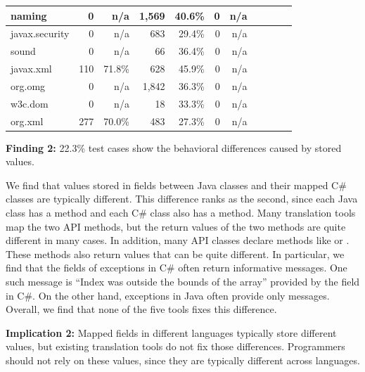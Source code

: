\begin{table}[t]
\begin{SmallOut}
\begin {tabular} {|l|r|r|r|r|r|r|r|r|r|r|}
\hline
naming      &  0     &    n/a     & 1,569    & 40.6\%  &  0         & n/a  \\
\hline
javax.security  &  0     &   n/a     & 683     & 29.4\%  &  0        & n/a\\
\hline
sound       &  0     &   n/a     & 66       & 36.4\%  &   0        &n/a  \\
\hline
javax.xml   &  110   &    71.8\%  &  628    & 45.9\%  &   0         & n/a\\
\hline
org.omg     &  0     &   n/a     & 1,842    & 36.3\%  & 0           & n/a  \\
\hline
w3c.dom     &  0     &   n/a     & 18      & 33.3\%  &  0         & n/a  \\
\hline
org.xml     &   277  &   70.0\%  & 483     & 27.3\%  & 0         & n/a\\
\hline
\end{tabular}%
 \label{table:packagetest}
\end{SmallOut}%
\end{table}

\textbf{Finding 2:} 22.3\% test cases show the behavioral differences caused by stored  values.

We find that  values stored in fields between Java classes and their mapped C\# classes are typically different. This difference ranks as the second, since each Java class has a  method and each C\# class also has a  method. Many translation tools map the two API methods, but the return values of the two methods are quite different in many cases. In addition, many API classes declare methods like  or . These methods also return  values that can be quite different. In particular, we find that the  fields of exceptions in C\# often return informative messages. One such message is ``Index was outside the bounds of the array'' provided by the  field in C\#. On the other hand, exceptions in Java often provide only  messages. Overall, we find that none of the five tools fixes this difference.

\textbf{Implication 2:} Mapped  fields in different languages typically store different values, but existing translation tools do not fix those differences. Programmers should not rely on these values, since they are typically different across languages.



